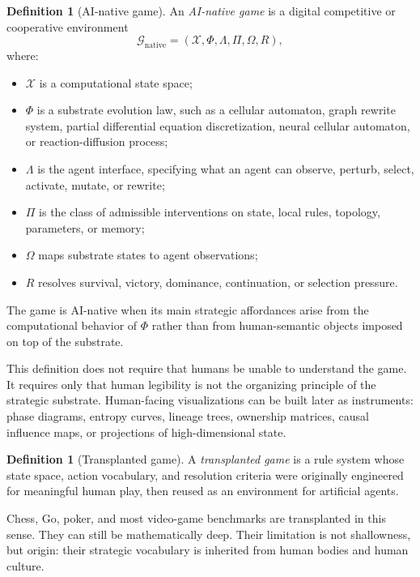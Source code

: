 \documentclass[11pt,a4paper]{article}
\theoremstyle{plain}
\theoremstyle{definition}
\newtheorem{definition}[theorem]{Definition}
\newcommand{\G}{\mathcal{G}}
\newcommand{\X}{\mathcal{X}}
\begin{document}
\begin{definition}[AI-native game]\label{def:ai-native-game}
An \emph{AI-native game} is a digital competitive or cooperative environment
\[
  \G_{\mathrm{native}}=(\X,\Phi,\Lambda,\Pi,\Omega,R),
\]
where:
\begin{itemize}
  \item $\X$ is a computational state space;
  \item $\Phi$ is a substrate evolution law, such as a cellular automaton, graph rewrite system, partial differential equation discretization, neural cellular automaton, or reaction-diffusion process;
  \item $\Lambda$ is the agent interface, specifying what an agent can observe, perturb, select, activate, mutate, or rewrite;
  \item $\Pi$ is the class of admissible interventions on state, local rules, topology, parameters, or memory;
  \item $\Omega$ maps substrate states to agent observations;
  \item $R$ resolves survival, victory, dominance, continuation, or selection pressure.
\end{itemize}
The game is AI-native when its main strategic affordances arise from the computational behavior of $\Phi$ rather than from human-semantic objects imposed on top of the substrate.
\end{definition}

This definition does not require that humans be unable to understand the game. It requires only that human legibility is not the organizing principle of the strategic substrate. Human-facing visualizations can be built later as instruments: phase diagrams, entropy curves, lineage trees, ownership matrices, causal influence maps, or projections of high-dimensional state.

\begin{definition}[Transplanted game]\label{def:transplanted-game}
A \emph{transplanted game} is a rule system whose state space, action vocabulary, and resolution criteria were originally engineered for meaningful human play, then reused as an environment for artificial agents.
\end{definition}

Chess, Go, poker, and most video-game benchmarks are transplanted in this sense. They can still be mathematically deep. Their limitation is not shallowness, but origin: their strategic vocabulary is inherited from human bodies and human culture.
\end{document}
